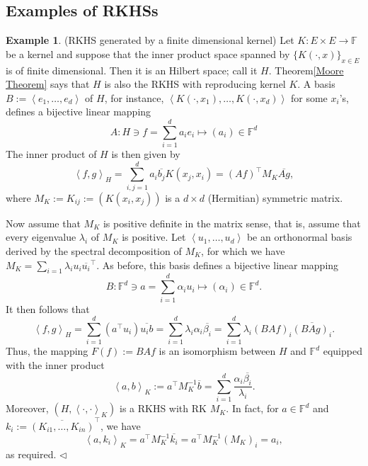 \documentclass[a4paper,12pt]{article}
\theoremstyle{remark}
\theoremstyle{definition}
\theoremstyle{definition}
\newtheorem{ex}[thm]{Example}
\theoremstyle{definition}
\newcommand{\ip}[2]{\left<#1, #2 \right>}
\newcommand{\transpose}[1]{#1^{\top}}
\newcommand{\fin}{\hfill \( \triangleleft \) }
\begin{document}
\subsection{Examples of RKHSs}


\begin{ex} (RKHS generated by a finite dimensional kernel) \label{ex rkhs finite dim kernel}
	Let \( K: E \times E \to \mathbb{F} \) be a kernel and suppose that the inner product space spanned by \( \{K(\cdot ,x)\}_{x \in E} \) is of finite dimensional. Then it is an Hilbert space; call it \( H \). Theorem\ref{Moore Theorem} says that \( H \) is also the RKHS with reproducing kernel \( K \).
	A basis \( B:= \left< e_1, \ldots, e_d  \right> \) of \( H \), for instance, \( \left< K(\cdot ,x_1), \ldots ,K(\cdot ,x_d) \right> \) for some \( x_i \)'s,
	defines a bijective linear mapping
	\[
		A : H \ni f = \sum_{i=1}^{d} a_i e_i \mapsto (a_i) \in \mathbb{F}^d
	\]
	The inner product of \( H \) is then given by
	\[
		\ip{f}{g}_H
		= \sum_{i,j=1}^{d} a_i \overline{b_j}K(x_j,x_i)
		= \transpose{(Af)}M_K \overline{Ag},
	\]
	where \( M_K:= K_{ij} := \left( K(x_i,x_j) \right) \) is a \( d \times d \) (Hermitian) symmetric matrix.

	Now assume that \( M_K \) is positive definite in the matrix sense, that is, assume that every eigenvalue \( \lambda_i \) of \( M_K \) is positive.
	Let \( \left< u_1, \ldots, u_d  \right> \) be an orthonormal basis derived by the spectral decomposition of \( M_K \), for which we have \( M_K = \sum_{i=1} \lambda_i u_i \transpose{\overline{u_i}} \).
	As before, this basis defines a bijective linear mapping
	\[
		B : \mathbb{F}^{d} \ni a = \sum_{i=1}^{d} \alpha_i u_i \mapsto (\alpha_i) \in  \mathbb{F}^{d}.
	\]
	It then follows that
	\[
		\ip{f}{g}_H
		= \sum_{i=1}^{d} \left( \transpose{a}u_i \right) \overline{u_i b}
		= \sum_{i=1}^{d} \lambda_i \alpha_i \overline{\beta_i}
		= \sum_{i=1}^{d} \lambda_i(BAf)_i \overline{(BAg)_i}.
	\]
	Thus, the mapping \( F(f) := BAf \) is an isomorphism between \( H \) and \( \mathbb{F}^d \) equipped with the inner product
	\[
		\ip{a}{b}_K := \transpose{a}M_K^{-1}\overline{b}
		= \sum_{i=1}^{d} \frac{\alpha_i\overline{\beta_i}}{\lambda_i}.
	\]
	Moreover, \( \left( H, \ip{\cdot }{\cdot }_{K} \right) \) is a RKHS with RK \( M_K \). In fact, for \( a \in \mathbb{F}^d \) and \( k_i:= \overline{(K_{i1}, \ldots, K_{in})}^{\top} \), we have
	\[
		\ip{a}{k_i}_K = \transpose{a}M_K^{-1}\overline{k_i} = \transpose{a}M_K^{-1} (M_K)_i = a_i,
	\]
	as required.
	\fin\end{ex}
\end{document}
